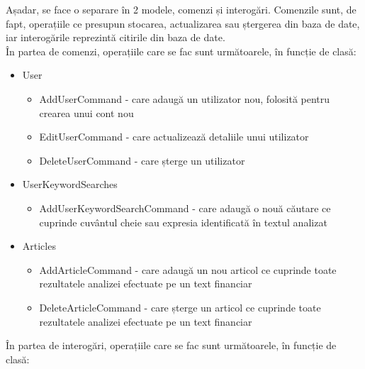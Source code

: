 Așadar, se face o separare în 2 modele, comenzi și interogări. Comenzile sunt, de fapt, operațiile ce presupun stocarea, actualizarea sau ștergerea din baza de date, iar interogările reprezintă citirile din baza de date. \\
În partea de comenzi, operațiile care se fac sunt următoarele, în funcție de clasă:
\begin{itemize}
	\setlength\itemsep{0.5em}
	\item User
	\begin{itemize}
		\setlength\itemsep{0.5em}
		\item AddUserCommand - care adaugă un utilizator nou, folosită pentru crearea unui cont nou
		\item EditUserCommand - care actualizează detaliile unui utilizator
		\item DeleteUserCommand - care șterge un utilizator
	\end{itemize}
	\item UserKeywordSearches
	\begin{itemize}
		\setlength\itemsep{0.5em}
		\item AddUserKeywordSearchCommand - care adaugă o nouă căutare ce cuprinde cuvântul cheie sau expresia identificată în textul analizat
	\end{itemize}
	\item Articles
	\begin{itemize}
		\setlength\itemsep{0.5em}
		\item AddArticleCommand - care adaugă un nou articol ce cuprinde toate rezultatele analizei efectuate pe un text financiar
		\item DeleteArticleCommand - care șterge un articol ce cuprinde toate rezultatele analizei efectuate pe un text financiar
	\end{itemize}
\end{itemize}
În partea de interogări, operațiile care se fac sunt următoarele, în funcție de clasă:
